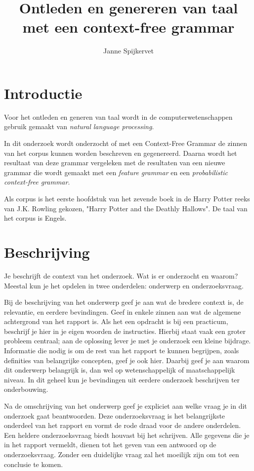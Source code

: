 \documentclass{article}
\begin{document}
\title{Ontleden en genereren van taal met een context-free grammar}
\author{Janne Spijkervet}
\maketitle

\section{Introductie}
Voor het ontleden en generen van taal wordt in de computerwetenschappen gebruik gemaakt van \emph{natural language processing}.

In dit onderzoek wordt onderzocht of met een Context-Free Grammar de zinnen van het corpus kunnen worden beschreven en gegenereerd. Daarna wordt het resultaat van deze grammar vergeleken met de resultaten van een nieuwe grammar die wordt gemaakt met een \emph{feature grammar} en een \emph{probabilistic context-free grammar}.

Als corpus is het eerste hoofdstuk van het zevende boek in de Harry Potter reeks van J.K. Rowling gekozen, "Harry Potter and the Deathly Hallows". De taal van het corpus is Engels.




\section{Beschrijving}

Je beschrijft de context van het onderzoek. Wat is er onderzocht en waarom? Meestal kun je het opdelen in twee onderdelen: onderwerp en onderzoeksvraag.

Bij de beschrijving van het onderwerp geef je aan wat de bredere context is, de relevantie, en eerdere bevindingen. Geef in enkele zinnen aan wat de algemene achtergrond van het rapport is. Als het een opdracht is bij een practicum, beschrijf je hier in je eigen woorden de instructies. Hierbij staat vaak een groter probleem centraal; aan de oplossing lever je met je onderzoek een kleine bijdrage. Informatie die nodig is om de rest van het rapport te kunnen begrijpen, zoals definities van belangrijke concepten, geef je ook hier. Daarbij geef je aan waarom dit onderwerp belangrijk is, dan wel op wetenschappelijk of maatschappelijk niveau. In dit geheel kun je bevindingen uit eerdere onderzoek beschrijven ter onderbouwing.

Na de omschrijving van het onderwerp geef je expliciet aan welke vraag je in dit onderzoek gaat beantwoorden. Deze onderzoeksvraag is het belangrijkste onderdeel van het rapport en vormt de rode draad voor de andere onderdelen. Een heldere onderzoeksvraag biedt houvast bij het schrijven. Alle gegevens die je in het rapport vermeldt, dienen tot het geven van een antwoord op de onderzoeksvraag. Zonder een duidelijke vraag zal het moeilijk zijn om tot een conclusie te komen.
\end{document}
